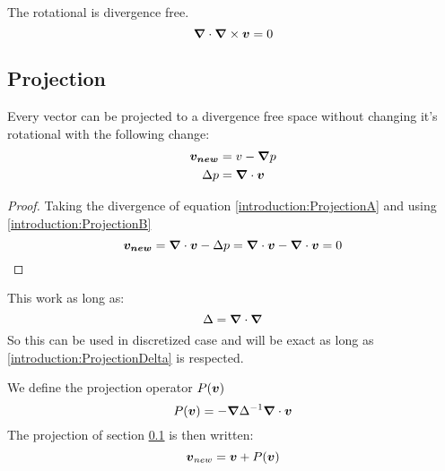 \begin{property}
The rotational is divergence free.
 \begin{equation}
  {\boldsymbol {\nabla}}\cdot {\boldsymbol {\nabla}} \times {\boldsymbol {v}}=0
 \end{equation}
\end{property}

\subsection{Projection}
\label{introduction:projection}
\begin{property}
 Every vector can be projected to a divergence free space without changing it's rotational with the following change:
\begin{align}
 {\boldsymbol {v_{new}}}&=v-{\boldsymbol {\nabla}}p \label{introduction:ProjectionA}\\
 \Delta p&={\boldsymbol {\nabla}} \cdot {\boldsymbol {v}} \label{introduction:ProjectionB}
\end{align}
\end{property}
\begin{proof}
  Taking the divergence of equation \ref{introduction:ProjectionA} and using \ref{introduction:ProjectionB}
  \begin{equation}
   {\boldsymbol {v_{new}}}={\boldsymbol {\nabla}}\cdot{\boldsymbol {v}}-\Delta p={\boldsymbol {\nabla}}\cdot{\boldsymbol {v}}-{\boldsymbol {\nabla}}\cdot{\boldsymbol {v}}=0
  \end{equation}
  \end{proof}
  
  \begin{remark}
 This work as long as:
 \begin{equation}
  \Delta={\boldsymbol {\nabla}}\cdot {\boldsymbol {\nabla}}\label{introduction:ProjectionDelta}
 \end{equation}
 So this can be used in discretized case and will be exact as long as \ref{introduction:ProjectionDelta} is respected.
 \end{remark}


\begin{definition}
\label{introduction:projectiondef}
We define the projection operator $P({\boldsymbol {v}})$
  \begin{equation}
    P({\boldsymbol {v}})=-{\boldsymbol {\nabla}}\Delta^{-1}{\boldsymbol {\nabla}}\cdot {\boldsymbol {v}}
  \end{equation}
  The projection of section \ref{introduction:projection} is then written:
  \begin{equation}
    {\boldsymbol {v}}_{new}={\boldsymbol {v}}+P({\boldsymbol {v}})
  \end{equation}
\end{definition}

